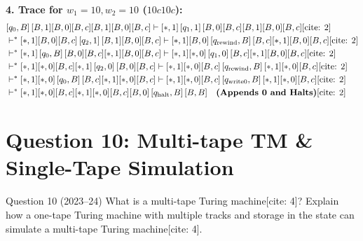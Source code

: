 \documentclass[11pt,a4paper]{article}
\begin{document}
\begin{solutionbox}
\textbf{4. Trace for $w_1 = 10, w_2 = 10$ ($10c10c$):}
\begin{align*}
& [q_0, B]\,[B,1][B,0][B,c][B,1][B,0][B,c] \vdash [*,1]\,[q_1, 1]\,[B,0][B,c][B,1][B,0][B,c] \text{[cite: 2]} \\
& \vdash^* [*,1][B,0][B,c]\,[q_2, 1]\,[B,1][B,0][B,c] \vdash [*,1][B,0]\,[q_{\text{rewind}}, B]\,[B,c][*,1][B,0][B,c] \text{[cite: 2]} \\
& \vdash^* [*,1]\,[q_0, B]\,[B,0][B,c][*,1][B,0][B,c] \vdash [*,1][*,0]\,[q_1, 0]\,[B,c][*,1][B,0][B,c] \text{[cite: 2]} \\
& \vdash^* [*,1][*,0][B,c][*,1]\,[q_2, 0]\,[B,0][B,c] \vdash [*,1][*,0][B,c]\,[q_{\text{rewind}}, B]\,[*,1][*,0][B,c] \text{[cite: 2]} \\
& \vdash^* [*,1][*,0]\,[q_0, B]\,[B,c][*,1][*,0][B,c] \vdash [*,1][*,0][B,c]\,[q_{\text{write0}}, B]\,[*,1][*,0][B,c] \text{[cite: 2]} \\
& \vdash^* [*,1][*,0][B,c][*,1][*,0][B,c][B,0]\,[q_{\text{halt}}, B]\,[B,B] \quad \text{\textbf{(Appends 0 and Halts)}} \text{[cite: 2]}
\end{align*}
\end{solutionbox}

\section{Question 10: Multi-tape TM \& Single-Tape Simulation}
\begin{questionbox}{Question 10 (2023--24)}
What is a multi-tape Turing machine[cite: 4]? Explain how a one-tape Turing machine with multiple tracks and storage in the state can simulate a multi-tape Turing machine[cite: 4].
\end{questionbox}
\end{document}
